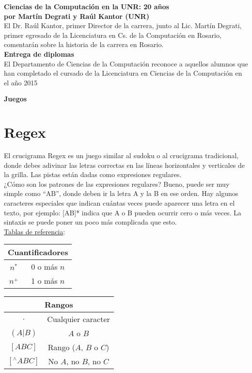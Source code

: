 \documentclass[12pt, a4paper]{article}
\newcommand{\charla}[3]{
	{\large\bf#1}\\
	{\bf por #2}\\
	#3\\
}
\begin{document}
\charla
{Ciencias de la Computación en la UNR: 20 años}
{Martín Degrati y Raúl Kantor (UNR)}
{El Dr. Raúl Kantor, primer Director de la carrera, junto al Lic. Martín Degrati, primer egresado de la Licenciatura en Cs. de la Computación en Rosario, comentarán sobre la historia de la carrera en Rosario.}

{\large\bf{Entrega de diplomas}}\\
{El Departamento de Ciencias de la Computación reconoce a aquellos alumnos que han completado el cursado de la Licenciatura en Ciencias de la Computación en el año 2015}

\newpage

\begin{center}\LARGE\bf Juegos\end{center}

\section{Regex}
El crucigrama Regex es un juego similar al sudoku o al crucigrama tradicional, donde debes adivinar las letras correctas en las líneas horizontales y verticales de la grilla. Las pistas están dadas como expresiones regulares.\\
¿Cómo son los patrones de las expresiones regulares? Bueno, puede ser muy simple como ``AB'', donde deben ir la letra A y la B en ese orden. Hay algunos caracteres especiales que indican cuántas veces puede aparecer una letra en el texto, por ejemplo: [AB]* indica que A o B pueden ocurrir cero o más veces. La sintaxis se puede poner un poco más complicada que esto.\\

\underline{Tablas de referencia}:
\begin{center}
\begin{tabular}{|c|c|}
\multicolumn{2}{c}{\bf Cuantificadores}\\ \hline
$n^{*}$ & 0 o más $n$ \\ \hline
$n^{+}$ & 1 o más $n$ \\ \hline
\end{tabular}
\hspace{50pt}
\begin{tabular}{|c|c|}
\multicolumn{2}{c}{\bf Rangos}\\ \hline
$.$ & Cualquier caracter \\ \hline
$(A|B)$ & $A$ o $B$ \\ \hline
$[ABC]$ & Rango ($A$, $B$ o $C$) \\ \hline
$[^{\wedge} ABC]$ & No $A$, no $B$, no $C$ \\ \hline
\end{tabular}
\end{center}
\end{document}
